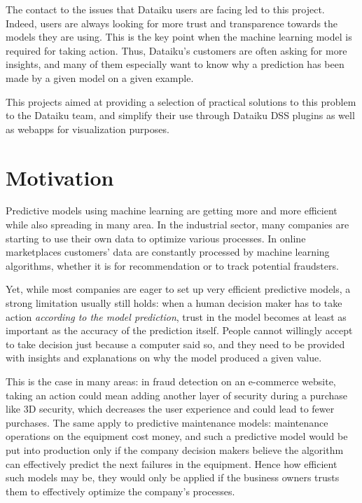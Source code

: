 \documentclass[a4paper,11pt]{kth-mag}
\begin{document}
The contact to the issues that Dataiku users are facing led to this project. Indeed, users are always looking for more trust and transparence towards the models they are using. This is the key point when the machine learning model is required for taking action. Thus, Dataiku's customers are often asking for more insights, and many of them especially want to know why a prediction has been made by a given model on a given example.

This projects aimed at providing a selection of practical solutions to this problem to the Dataiku team, and simplify their use through Dataiku DSS plugins as well as webapps for visualization purposes.

\section{Motivation}

Predictive models using machine learning are getting more and more efficient while also spreading in many area. In the industrial sector, many companies are starting to use their own data to optimize various processes. In online marketplaces customers' data are constantly processed by machine learning algorithms, whether it is for recommendation or to track potential fraudsters.

Yet, while most companies are eager to set up very efficient predictive models, a strong limitation usually still holds: when a human decision maker has to take action \textit{according to the model prediction}, trust in the model becomes at least as important as the accuracy of the prediction itself. People cannot willingly accept to take decision just because a computer said so, and they need to be provided with insights and explanations on why the model produced a given value.

This is the case in many areas: in fraud detection on an e-commerce website,  taking an action could mean adding another layer of security during a purchase like 3D security, which decreases the user experience and could lead to fewer purchases. The same apply to predictive maintenance models: maintenance operations on the equipment cost money, and such a predictive model would be put into production only if the company decision makers believe the algorithm can effectively predict the next failures in the equipment. Hence how efficient such models may be, they would only be applied if the business owners trusts them to effectively optimize the company's processes.
\end{document}
